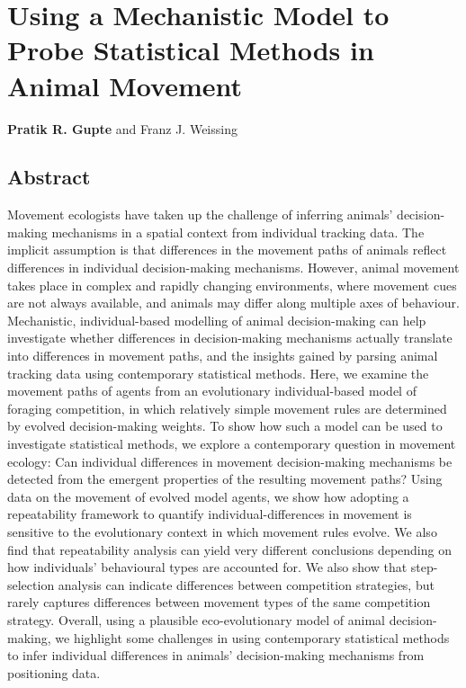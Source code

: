 \chapter{Using a Mechanistic Model to Probe Statistical Methods in Animal Movement}\label{ch:patternprocess}

{\noindent \sffamily\textbf{Pratik R. Gupte} and Franz J. Weissing}

\section*{Abstract}

\small{
    Movement ecologists have taken up the challenge of inferring animals' decision-making mechanisms in a spatial context from individual tracking data.
    The implicit assumption is that differences in the movement paths of animals reflect differences in individual decision-making mechanisms.
    However, animal movement takes place in complex and rapidly changing environments, where movement cues are not always available, and animals may differ along multiple axes of behaviour.
    Mechanistic, individual-based modelling of animal decision-making can help investigate whether differences in decision-making mechanisms actually translate into differences in movement paths, and the insights gained by parsing animal tracking data using contemporary statistical methods.
    Here, we examine the movement paths of agents from an evolutionary individual-based model of foraging competition, in which relatively simple movement rules are determined by evolved decision-making weights.
    To show how such a model can be used to investigate statistical methods, we explore a contemporary question in movement ecology: Can individual differences in movement decision-making mechanisms be detected from the emergent properties of the resulting movement paths?
    Using data on the movement of evolved model agents, we show how adopting a repeatability framework to quantify individual-differences in movement is sensitive to the evolutionary context in which movement rules evolve.
    We also find that repeatability analysis can yield very different conclusions depending on how individuals' behavioural types are accounted for.
    We also show that step-selection analysis can indicate differences between competition strategies, but rarely captures differences between movement types of the same competition strategy.
    Overall, using a plausible eco-evolutionary model of animal decision-making, we highlight some challenges in using contemporary statistical methods to infer individual differences in animals' decision-making mechanisms from positioning data.

    \medskip

}

\clearpage
